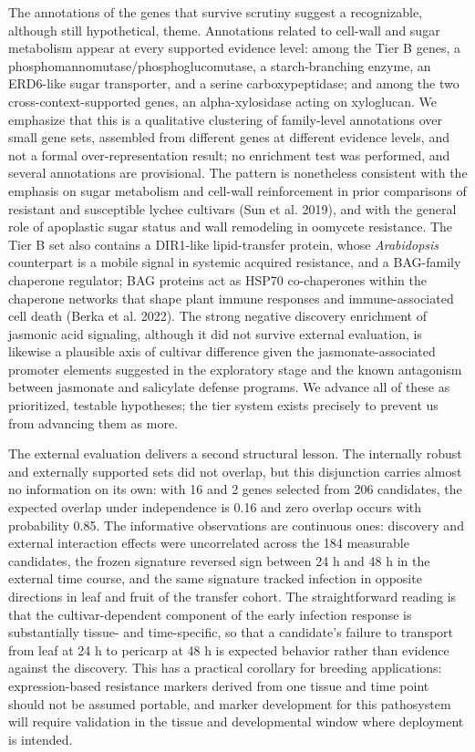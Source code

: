 \documentclass[12pt,letterpaper]{article}
\begin{document}
The annotations of the genes that survive scrutiny suggest a recognizable, although still hypothetical, theme. Annotations related to cell-wall and sugar metabolism appear at every supported evidence level: among the Tier B genes, a phosphomannomutase/phosphoglucomutase, a starch-branching enzyme, an ERD6-like sugar transporter, and a serine carboxypeptidase; and among the two cross-context-supported genes, an alpha-xylosidase acting on xyloglucan. We emphasize that this is a qualitative clustering of family-level annotations over small gene sets, assembled from different genes at different evidence levels, and not a formal over-representation result; no enrichment test was performed, and several annotations are provisional. The pattern is nonetheless consistent with the emphasis on sugar metabolism and cell-wall reinforcement in prior comparisons of resistant and susceptible lychee cultivars (Sun et al. 2019), and with the general role of apoplastic sugar status and wall remodeling in oomycete resistance. The Tier B set also contains a DIR1-like lipid-transfer protein, whose \textit{Arabidopsis} counterpart is a mobile signal in systemic acquired resistance, and a BAG-family chaperone regulator; BAG proteins act as HSP70 co-chaperones within the chaperone networks that shape plant immune responses and immune-associated cell death (Berka et al. 2022). The strong negative discovery enrichment of jasmonic acid signaling, although it did not survive external evaluation, is likewise a plausible axis of cultivar difference given the jasmonate-associated promoter elements suggested in the exploratory stage and the known antagonism between jasmonate and salicylate defense programs. We advance all of these as prioritized, testable hypotheses; the tier system exists precisely to prevent us from advancing them as more.

The external evaluation delivers a second structural lesson. The internally robust and externally supported sets did not overlap, but this disjunction carries almost no information on its own: with 16 and 2 genes selected from 206 candidates, the expected overlap under independence is 0.16 and zero overlap occurs with probability 0.85. The informative observations are continuous ones: discovery and external interaction effects were uncorrelated across the 184 measurable candidates, the frozen signature reversed sign between 24 h and 48 h in the external time course, and the same signature tracked infection in opposite directions in leaf and fruit of the transfer cohort. The straightforward reading is that the cultivar-dependent component of the early infection response is substantially tissue- and time-specific, so that a candidate's failure to transport from leaf at 24 h to pericarp at 48 h is expected behavior rather than evidence against the discovery. This has a practical corollary for breeding applications: expression-based resistance markers derived from one tissue and time point should not be assumed portable, and marker development for this pathosystem will require validation in the tissue and developmental window where deployment is intended.
\end{document}
